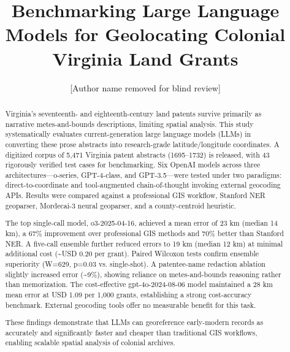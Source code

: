 \documentclass{josis}
\providecommand{\DIFaddbegin}{} %
\providecommand{\DIFaddend}{} %
\providecommand{\DIFdelbegin}{} %
\providecommand{\DIFdelend}{} %
\begin{document}
\title{Benchmarking Large Language Models for Geolocating Colonial Virginia Land Grants}
\author{[Author name removed for blind review]}

\maketitle


\begin{abstract}
Virginia's seventeenth- and eighteenth-century land patents survive primarily as narrative metes-and-bounds descriptions, limiting spatial analysis. This study systematically evaluates current-generation large language models (LLMs) in converting these prose abstracts into research-grade latitude/longitude coordinates. A digitized corpus of 5,471 Virginia patent abstracts (1695–1732) is released, with 43 rigorously verified test cases for benchmarking. Six OpenAI models across three architectures—o-series, GPT-4-class, and GPT-3.5—were tested under two paradigms: direct-to-coordinate and tool-augmented chain-of-thought invoking external geocoding APIs. Results were compared against a professional GIS workflow, Stanford NER geoparser, Mordecai-3 neural geoparser, and a county-centroid heuristic.

The top single-call model, o3-2025-04-16, achieved a mean error of 23 km (median 14 km), a 67\% improvement over professional GIS methods and 70\% better than Stanford NER. A five-call ensemble further reduced errors to 19 km (median 12 km) at minimal additional cost (\textasciitilde USD 0.20 per grant). Paired Wilcoxon tests confirm ensemble superiority (W=629, p=0.03 vs. single-shot). A patentee-name redaction ablation slightly increased error (\textasciitilde 9\%), showing reliance on metes-and-bounds reasoning rather than memorization. The cost-effective gpt-4o-2024-08-06 model maintained a 28 km mean error at USD 1.09 per 1,000 grants, establishing a strong cost-accuracy benchmark. External geocoding tools offer no measurable benefit for this task.

These findings demonstrate that LLMs can georeference early-modern records as accurately and significantly faster and cheaper than traditional GIS workflows, enabling scalable spatial analysis of colonial archives.
\end{abstract}




\DIFdelbegin %
\DIFdelend \DIFaddbegin 
\DIFaddend 
\end{document}
